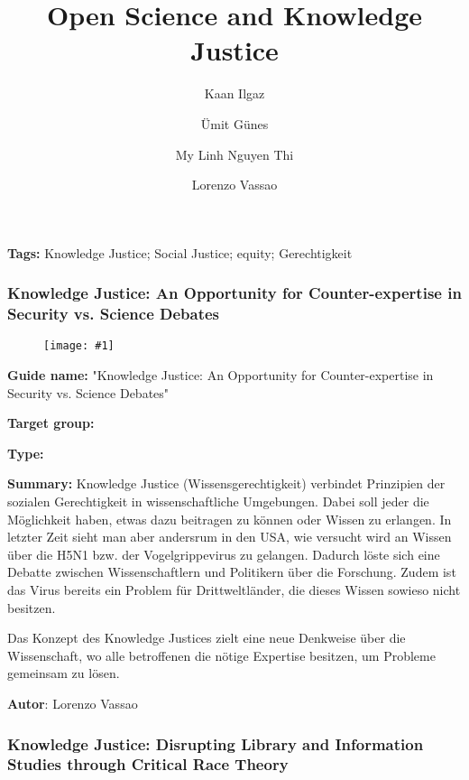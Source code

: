\documentclass{article}
\newlength{\imgwidth}
\newcommand\scaledgraphics[2]{%
                
\settowidth{\imgwidth}{\texttt{[image: \#1]}}%
                
\setlength{\imgwidth}{\minof{\imgwidth}{#2\textwidth}}%
                
\texttt{[image: \#1]}%
                
}
\begin{document}
\title{Open Science and Knowledge Justice}

\maketitle

\author{Kaan Ilgaz}
\author{Ümit Günes}
\author{My Linh Nguyen Thi}
\author{Lorenzo Vassao}
\affil{}





\textbf{Tags:} Knowledge Justice; Social Justice; equity; Gerechtigkeit


\subsubsection{Knowledge Justice: An Opportunity for Counter-expertise in Security vs. Science Debates}\label{H870315}


\begin{figure}
\scaledgraphics{086e7cc2-fafd-4cc2-8c8f-018ac3a9884d.png}{1}
\label{F24704971}
\end{figure}





\textbf{Guide name:} "Knowledge Justice: An Opportunity for Counter-expertise in Security vs. Science Debates" \autocite{r_egert_knowledge_2017}


\textbf{Target group:}


\textbf{Type:} 


\textbf{Summary: }Knowledge Justice (Wissensgerechtigkeit) verbindet Prinzipien der sozialen Gerechtigkeit in wissenschaftliche Umgebungen. Dabei soll jeder die Möglichkeit haben, etwas dazu beitragen zu können oder Wissen zu erlangen. In letzter Zeit sieht man aber andersrum in den USA, wie versucht wird an Wissen über die H5N1 bzw. der Vogelgrippevirus zu gelangen. Dadurch löste sich eine Debatte zwischen Wissenschaftlern und Politikern über die Forschung. Zudem ist das Virus bereits ein Problem für Drittweltländer, die dieses Wissen sowieso nicht besitzen.


Das Konzept des Knowledge Justices zielt eine neue Denkweise über die Wissenschaft, wo alle betroffenen die nötige Expertise besitzen, um Probleme gemeinsam zu lösen.


\textbf{Autor}: Lorenzo Vassao


\subsubsection{Knowledge Justice: Disrupting Library and Information Studies through Critical Race Theory}\label{H8244312}
\end{document}
